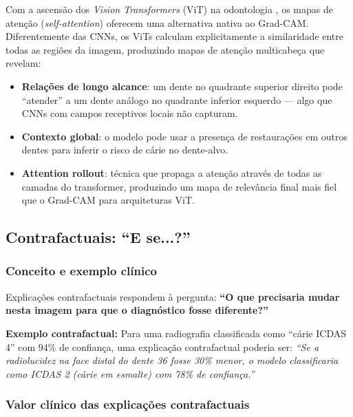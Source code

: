 Com a ascensão dos \textit{Vision Transformers} (ViT) na odontologia
\cite{vaswani2017transformer}, os mapas de atenção (\textit{self-attention})
oferecem uma alternativa nativa ao Grad-CAM. Diferentemente das CNNs,
os ViTs calculam explicitamente a similaridade entre todas as regiões
da imagem, produzindo mapas de atenção multicabeça que revelam:

\begin{itemize}
  \item \textbf{Relações de longo alcance}: um dente no quadrante superior
    direito pode ``atender'' a um dente análogo no quadrante inferior
    esquerdo — algo que CNNs com campos receptivos locais não capturam.
  \item \textbf{Contexto global}: o modelo pode usar a presença de
    restaurações em outros dentes para inferir o risco de cárie no
    dente-alvo.
  \item \textbf{Attention rollout}: técnica que propaga a atenção através
    de todas as camadas do transformer, produzindo um mapa de relevância
    final mais fiel que o Grad-CAM para arquiteturas ViT.
\end{itemize}

\subsection{Contrafactuais: ``E se...?''}

\subsubsection{Conceito e exemplo clínico}

Explicações contrafactuais respondem à pergunta: \textbf{``O que
precisaria mudar nesta imagem para que o diagnóstico fosse diferente?''}

\begin{mdframed}[linecolor=corSecundaria, linewidth=1pt, backgroundcolor=corSecundaria!5, roundcorner=4pt]
  \textbf{Exemplo contrafactual:} Para uma radiografia classificada como
  ``cárie ICDAS 4'' com 94\% de confiança, uma explicação contrafactual
  poderia ser: \textit{``Se a radiolucidez na face distal do dente 36
  fosse 30\% menor, o modelo classificaria como ICDAS 2 (cárie em
  esmalte) com 78\% de confiança.''}
\end{mdframed}

\subsubsection{Valor clínico das explicações contrafactuais}


